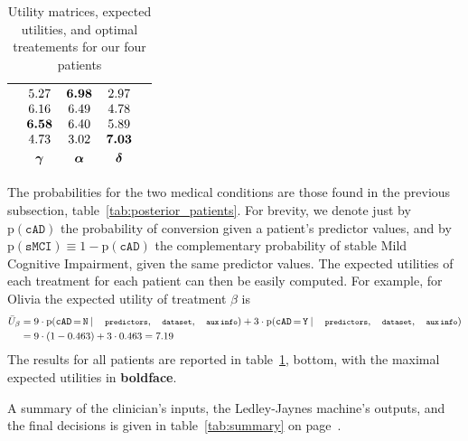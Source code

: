 \documentclass[utf8]{FrontiersinHarvard} %
\newcommand*{\mo}[1][=]{\mathord{\,#1\,}}
\newcommand*{\p}{\mathrm{p}}%
\renewcommand*{\|}[1][]{\nonscript\:#1\vert\nonscript\:\mathopen{}}
\newcommand*{\eU}{\bar{U}}
\newcommand*{\cad}{\texttt{cAD}}
\newcommand*{\smci}{\texttt{sMCI}}
\newcommand*{\yes}{\texttt{Y}}
\newcommand*{\no}{\texttt{N}}
\newcommand*{\predictors}{\texttt{\footnotesize predictors}}
\newcommand*{\dataset}{\texttt{\footnotesize dataset}}
\newcommand*{\auxinfo}{\texttt{\footnotesize aux\,info}}
\newcommand*{\mci}{Mild Cognitive Impairment}
\newcommand*{\ljm}{Ledley-Jaynes machine}
\begin{document}
\begin{table}[!h]
\begin{tabular}{lcccc}
    &
    $\begin{matrix}5.27\\6.16\\\bm{6.58}\\4.73\\[\jot]\bm{\gamma}\end{matrix}$
    &
    $\begin{matrix}\bm{6.98}\\6.49\\6.40\\3.02\\[\jot]\bm{\alpha}\end{matrix}$
    &
    $\begin{matrix}2.97\\4.78\\5.89\\\bm{7.03}\\[\jot]\bm{\delta}\end{matrix}$
    \\[5\jot]
    \hline
  \end{tabular}
  \caption{Utility matrices, expected utilities, and optimal treatements for our four patients}\label{tab:utilities_patients}
\end{table}

The probabilities for the two medical conditions are those found in the previous subsection, table~\ref{tab:posterior_patients}. For brevity, we denote just by $\p(\cad)$ the probability of conversion given a patient's predictor values, and by $\p(\smci)\equiv 1- \p(\cad)$ the complementary probability of stable \mci, given the same predictor values. The expected utilities of each treatment for each patient can then be easily computed. For example, for Olivia the expected utility of treatment $\beta$ is
\begin{equation}
  \label{eq:utility_olivia_example}
  \begin{split}
  \eU_{\beta} &=
  9 \cdot \p(\cad\mo\no \| \predictors,\dataset,\auxinfo) +
  3 \cdot \p(\cad\mo\yes \| \predictors,\dataset,\auxinfo)
  \\&=  9 \cdot (1-0.463) + 3 \cdot 0.463 = 7.19
\end{split}
\end{equation}
The results for all patients are reported in table~\ref{tab:utilities_patients}, bottom, with the maximal expected utilities in \textbf{boldface}.

A summary of the clinician's inputs, the \ljm's outputs, and the final decisions is given in table~\ref{tab:summary} on page~\pageref{tab:summary}.
\end{document}
